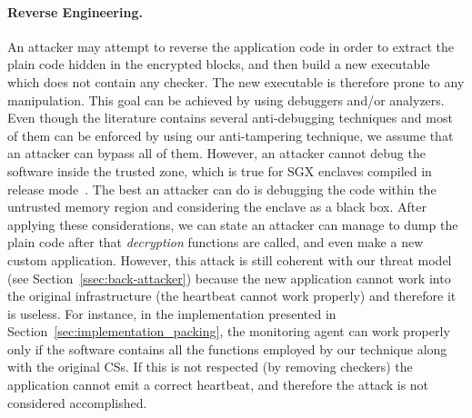 \paragraph{Reverse Engineering.}
An attacker may attempt to reverse the application code in order to extract the 
plain code hidden in the encrypted blocks, and then build a new executable 
which does not contain any checker.
The new executable is therefore prone to any manipulation.
This goal can be achieved by using debuggers and/or analyzers.
Even though the literature contains several anti-debugging techniques and most 
of them can be enforced by using our anti-tampering technique, we assume that 
an attacker can bypass all of them.
However, an attacker cannot debug the software inside the trusted zone, which 
is true for SGX enclaves compiled in release mode~\citep{sgxnodebug}.
The best an attacker can do is debugging the code within the untrusted memory 
region and considering the enclave as a black box.
After applying these considerations, we can state an attacker can manage to 
dump the plain code after that \emph{decryption} functions are called, and even 
make a new custom application.
However, this attack is still coherent with our threat model (see 
Section~\ref{ssec:back-attacker}) because the new application cannot work into 
the original infrastructure (\ie the heartbeat cannot work properly) and 
therefore it is useless.
For instance, in the implementation presented in 
Section~\ref{sec:implementation_packing}, 
the monitoring agent can work properly only if the software contains all the 
functions employed by our technique along with the original CSs.
If this is not respected  (\ie by removing checkers) the application cannot 
emit a correct heartbeat,
and therefore the attack is not considered accomplished.


